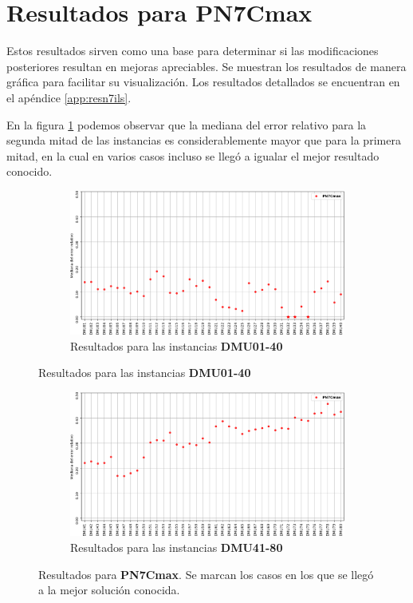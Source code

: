 \section{Resultados para PN7Cmax}
Estos resultados sirven como una base para determinar si las modificaciones posteriores resultan en mejoras apreciables.
%
Se muestran los resultados de manera gráfica para facilitar su visualización. 
%
Los resultados detallados se encuentran en el apéndice \ref{app:resn7ils}. 

En la figura \ref{fig:PN7Cmax} podemos observar que la mediana del error relativo para la segunda mitad de las instancias es considerablemente 
mayor que para la primera mitad, en la cual en varios casos incluso se llegó a igualar el mejor resultado conocido.  
\begin{figure}[hbtp]
    \begin{subfigure}{\textwidth}
        \centering
        \includegraphics[scale=.65]{Imagenes/resn7ils1.png}
        \caption{Resultados para las instancias \textbf{DMU01-40}}
    \end{subfigure}
\end{figure}
\begin{figure}[H]\ContinuedFloat
    \begin{subfigure}{\textwidth}
        \centering
        \includegraphics[scale=.65]{Imagenes/resn7ils2.png}
        \caption{Resultados para las instancias \textbf{DMU41-80}}
    \end{subfigure}
    \caption{Resultados para \textbf{PN7Cmax}. Se marcan los casos en los que se llegó a la mejor solución conocida.}
    \label{fig:PN7Cmax}
\end{figure}

